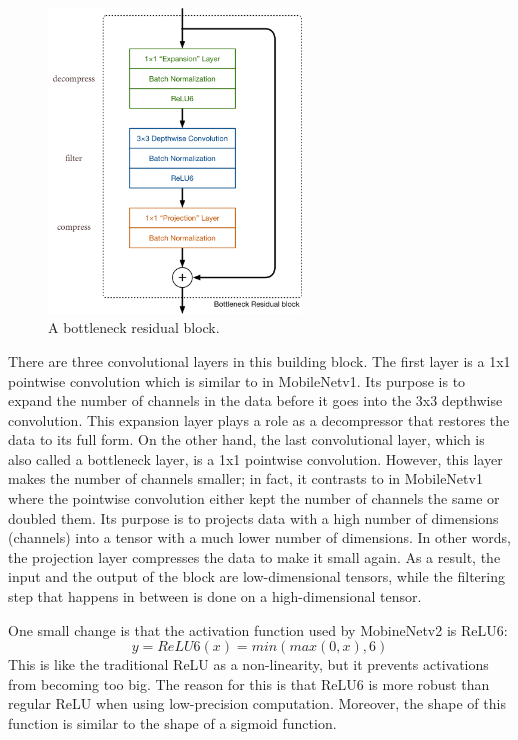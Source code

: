  \begin{figure}[H]
     \centering
     \includegraphics[width=0.6\textwidth]{chapter3/image/block_edited.png}
     \caption{A bottleneck residual block.}
     \label{fig:mobi2bottleneck}
 \end{figure}
There are three convolutional layers in this building block. The first layer is a 1x1 pointwise convolution which is similar to in MobileNetv1.  Its purpose is to expand the number of channels in the data before it goes into the 3x3 depthwise convolution. This expansion layer plays a role as a decompressor that restores the data to its full form. On the other hand, the last convolutional layer, which is also called a bottleneck layer, is a 1x1 pointwise convolution. However, this layer makes the number of channels smaller; in fact, it contrasts to in MobileNetv1 where the pointwise convolution either kept the number of channels the same or doubled them. Its purpose is to projects data with a high number of dimensions (channels) into a tensor with a much lower number of dimensions. In other words, the projection layer compresses the data to make it small again. As a result, the input and the output of the block are low-dimensional tensors, while the filtering step that happens in between is done on a high-dimensional tensor.
 \par
 
 One small change is that the activation function used by MobineNetv2 is ReLU6:
 \begin{equation}
 y = ReLU6(x) = min(max(0, x), 6)
 \end{equation}
 This is like the traditional ReLU as a non-linearity, but it prevents activations from becoming too big. The reason for this is that ReLU6 is more robust than regular ReLU when using low-precision computation. Moreover, the shape of this function is similar to the shape of a sigmoid function. \par
 

